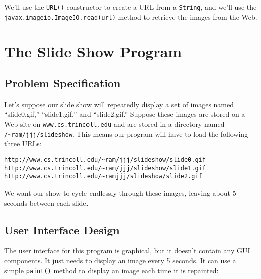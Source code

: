    We'll use the {\tt URL()}
constructor to create a URL from a {\tt String}, and we'll use
the {\tt javax.imageio.ImageIO.read(url)} method to retrieve the images
from the Web.


\section{The Slide Show Program}
\label{the-slide-show-program}
\subsection*{Problem Specification}
\noindent Let's suppose our slide show will repeatedly display a set of images
named ``slide0.gif,'' ``slide1.gif,'' and ``slide2.gif.'' Suppose these
images are stored on a Web site on {\tt www.cs.trincoll.edu} and are
stored in a directory named {\tt /\verb!~!ram/jjj/slideshow}. This means
our program will have to load the following three URLs:

\begin{jjjlisting}[28pc]
\begin{lstlisting}[commentstyle=\color{black}]
http://www.cs.trincoll.edu/~ram/jjj/slideshow/slide0.gif
http://www.cs.trincoll.edu/~ram/jjj/slideshow/slide1.gif
http://www.cs.trincoll.edu/~ramjjj/slideshow/slide2.gif
\end{lstlisting}
\end{jjjlisting}

\noindent We want our show to cycle endlessly through these
images, leaving about 5 seconds between each slide.

\subsection*{User Interface Design}
\noindent The user interface for this program is graphical, but it
doesn't contain any GUI components.  It just needs to display an image
every 5 seconds.   It can use a simple {\tt paint()} method to display
an image each time it is repainted:

